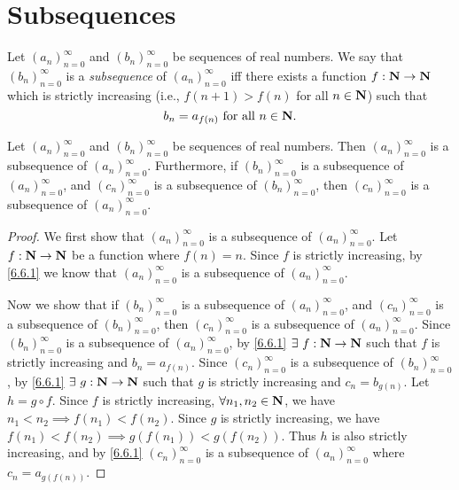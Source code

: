 \section{Subsequences}\label{sec 6.6}

\begin{definition}[Subsequences]\label{6.6.1}
  Let \((a_n)_{n = 0}^\infty\) and \((b_n)_{n = 0}^\infty\) be sequences of real numbers.
  We say that \((b_n)_{n = 0}^\infty\) is a \emph{subsequence} of \((a_n)_{n = 0}^\infty\) iff there exists a function \(f : \mathbf{N} \to \mathbf{N}\) which is strictly increasing (i.e., \(f(n + 1) > f(n)\) for all \(n \in \mathbf{N}\)) such that
  \[
    b_n = a_{f(n)} \text{ for all } n \in \mathbf{N}.
  \]
\end{definition}

\setcounter{theorem}{3}
\begin{lemma}\label{6.6.4}
  Let \((a_n)_{n = 0}^\infty\) and \((b_n)_{n = 0}^\infty\) be sequences of real numbers.
  Then \((a_n)_{n = 0}^\infty\) is a subsequence of \((a_n)_{n = 0}^\infty\).
  Furthermore, if \((b_n)_{n = 0}^\infty\) is a subsequence of \((a_n)_{n = 0}^\infty\), and \((c_n)_{n = 0}^\infty\) is a subsequence of \((b_n)_{n = 0}^\infty\), then \((c_n)_{n = 0}^\infty\) is a subsequence of \((a_n)_{n = 0}^\infty\).
\end{lemma}

\begin{proof}
  We first show that \((a_n)_{n = 0}^\infty\) is a subsequence of \((a_n)_{n = 0}^\infty\).
  Let \(f : \mathbf{N} \to \mathbf{N}\) be a function where \(f(n) = n\).
  Since \(f\) is strictly increasing, by \cref{6.6.1} we know that \((a_n)_{n = 0}^\infty\) is a subsequence of \((a_n)_{n = 0}^\infty\).

  Now we show that if \((b_n)_{n = 0}^\infty\) is a subsequence of \((a_n)_{n = 0}^\infty\), and \((c_n)_{n = 0}^\infty\) is a subsequence of \((b_n)_{n = 0}^\infty\), then \((c_n)_{n = 0}^\infty\) is a subsequence of \((a_n)_{n = 0}^\infty\).
  Since \((b_n)_{n = 0}^\infty\) is a subsequence of \((a_n)_{n = 0}^\infty\), by \cref{6.6.1} \(\exists\ f : \mathbf{N} \to \mathbf{N}\) such that \(f\) is strictly increasing and \(b_n = a_{f(n)}\).
  Since \((c_n)_{n = 0}^\infty\) is a subsequence of \((b_n)_{n = 0}^\infty\), by \cref{6.6.1} \(\exists\ g : \mathbf{N} \to \mathbf{N}\) such that \(g\) is strictly increasing and \(c_n = b_{g(n)}\).
  Let \(h = g \circ f\).
  Since \(f\) is strictly increasing, \(\forall n_1, n_2 \in \mathbf{N}\), we have \(n_1 < n_2 \implies f(n_1) < f(n_2)\).
  Since \(g\) is strictly increasing, we have \(f(n_1) < f(n_2) \implies g(f(n_1)) < g(f(n_2))\).
  Thus \(h\) is also strictly increasing, and by \cref{6.6.1} \((c_n)_{n = 0}^\infty\) is a subsequence of \((a_n)_{n = 0}^\infty\) where \(c_n = a_{g(f(n))}\).
\end{proof}

